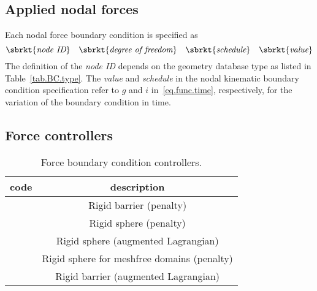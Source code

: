 \subsection{Applied nodal forces}
\label{set.ICandBC.FBC}
Each nodal force boundary condition is specified as
\[
\sbrkt{\textit{node ID}} \quad 
\sbrkt{\textit{degree of freedom}} \quad
\sbrkt{\textit{schedule}} \quad
\sbrkt{\textit{value}}
\]
The definition of the \textit{node ID} depends on the geometry 
database type as listed in Table~\ref{tab.BC.type}. 
The \textit{value} and \textit{schedule} in the nodal kinematic 
boundary condition specification refer to 
$g$ and $i$ in~\eqref{eq.func.time}, respectively, for the variation 
of the boundary condition in time.

\subsection{Force controllers}
\label{set.ICandBC.FBC.controller}

\begin{table}[h]
\caption{\label{tab.FBC.controller.type} Force boundary condition controllers.}
\begin{center}
\begin{tabular}[c]{|c|c|}
\hline
 \parbox[b]{0.75in}{\centering \textbf{code}}
&\parbox[b]{4.0in}{\raggedright \textbf{description}}\\
\hline
\parbox[b]{0.75in}{} & 
\parbox[b]{4.0in}{\raggedright Rigid barrier (penalty)}\\
\hline
\parbox[b]{0.75in}{}  & 
\parbox[b]{4.0in}{\raggedright Rigid sphere (penalty)}\\
\hline
\parbox[b]{0.75in}{}  & 
\parbox[b]{4.0in}{\raggedright Rigid sphere (augmented Lagrangian)}\\
\hline
\parbox[b]{0.75in}{}  & 
\parbox[b]{4.0in}{\raggedright Rigid sphere for meshfree domains (penalty)}\\
\hline
\parbox[b]{0.75in}{}  & 
\parbox[b]{4.0in}{\raggedright Rigid barrier (augmented Lagrangian)}\\
\hline
\end{tabular}
\end{center}
\end{table}

\\


